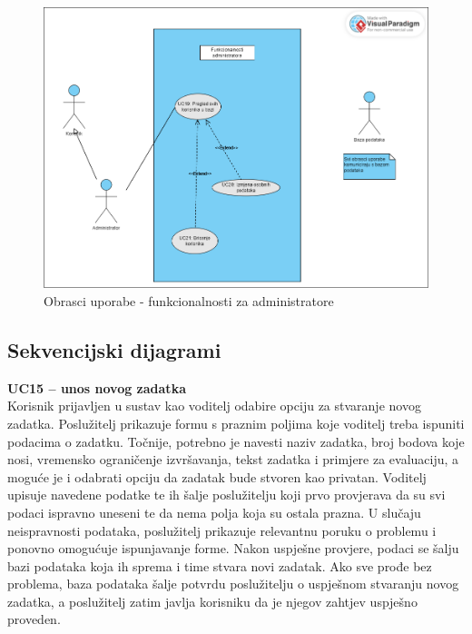 					\begin{figure}[H]
						\includegraphics[scale=0.4]{dijagrami/obrasci_uporabe3.png} 
						\centering
						\caption{Obrasci uporabe - funkcionalnosti za administratore}
						\label{fig:obrasci_uporabe3}
					\end{figure}
				\eject		
				
			\subsection{Sekvencijski dijagrami}
				
%				


				\noindent \textbf{UC15 – unos novog zadatka}\\
				
				\noindent Korisnik prijavljen u sustav kao voditelj odabire opciju za stvaranje novog zadatka. Poslužitelj prikazuje formu s praznim poljima koje voditelj treba ispuniti podacima o zadatku. Točnije, potrebno je navesti naziv zadatka, broj bodova koje nosi, vremensko ograničenje izvršavanja, tekst zadatka i primjere za evaluaciju, a moguće je i odabrati opciju da zadatak bude stvoren kao privatan. Voditelj upisuje navedene podatke te ih šalje poslužitelju koji prvo provjerava da su svi podaci ispravno uneseni te da nema polja koja su ostala prazna. U slučaju neispravnosti podataka, poslužitelj prikazuje relevantnu poruku o problemu i ponovno omogućuje ispunjavanje forme. Nakon uspješne provjere, podaci se šalju bazi podataka koja ih sprema i time stvara novi zadatak. Ako sve prođe bez problema, baza podataka šalje potvrdu poslužitelju o uspješnom stvaranju novog zadatka, a poslužitelj zatim javlja korisniku da je njegov zahtjev uspješno proveden.
				
